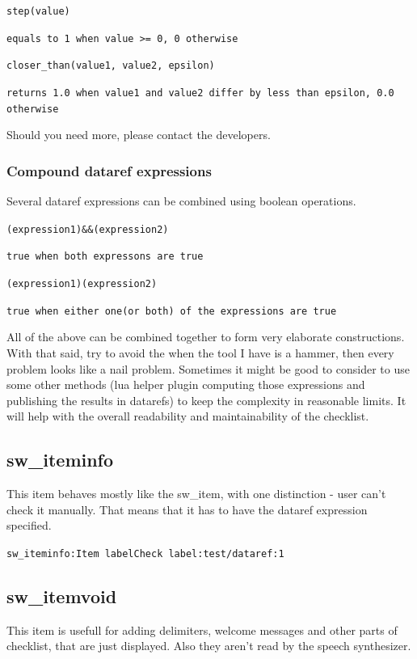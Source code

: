 \documentclass[11pt,parskip=half,a4paper]{scrartcl}
\newcommand\textstyleSourceText[1]{\texttt{#1}}
\begin{document}
\textstyleSourceText{step(value)}

{\ttfamily
\textstyleSourceText{equals to 1 when value {\textgreater}= 0, 0 otherwise}}

\textstyleSourceText{closer\_than(value1, value2, epsilon)}

{\ttfamily
\textstyleSourceText{returns 1.0 when value1 and value2 differ by less than epsilon, 0.0 otherwise}}

Should you need more, please contact the developers.

\subsubsection{Compound dataref expressions}
Several dataref expressions can be combined using boolean operations.

\textstyleSourceText{(expression1)\&\&(expression2)}

{\ttfamily
\textstyleSourceText{true when both expressons are true}}

\textstyleSourceText{(expression1){\textbar}{\textbar}(expression2)}

{\ttfamily
\textstyleSourceText{true when either one(or both) of the expressions are true}}

All of the above can be combined together to form very elaborate constructions. With that said, try to avoid the
{\textquotedbl}when the tool I have is a hammer, then every problem looks like a nail{\textquotedbl} problem. Sometimes it might be good to consider to use some other methods (lua helper plugin computing those expressions and publishing the results in datarefs) to keep the complexity in reasonable limits. It will help with the overall readability and maintainability of the checklist.

\subsection[sw\_iteminfo]{sw\_iteminfo}
This item behaves mostly like the sw\_item, with one distinction - user can't check it manually. That means that it has to have the dataref expression specified.

\textstyleSourceText{sw\_iteminfo:Item label{\textbar}Check label:test/dataref:1}

\subsection{sw\_itemvoid}
This item is usefull for adding delimiters, welcome messages and other parts of checklist, that are just displayed. Also they aren't read by the speech synthesizer.
\end{document}
